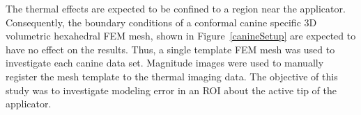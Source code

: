 \documentclass{article}
\begin{document}

The thermal effects are expected to be confined to a region near
the applicator. Consequently, the boundary conditions of a
conformal canine specific 3D volumetric hexahedral FEM mesh, shown
in Figure~\ref{canineSetup} are expected to have no effect on the
results.  Thus, a single template FEM mesh was used to investigate
each canine data set. Magnitude images were used to manually
register the mesh template to the thermal imaging data.  The
objective of this study was to investigate modeling error in an ROI
about the active tip of the applicator.  


%
%
\end{document}
